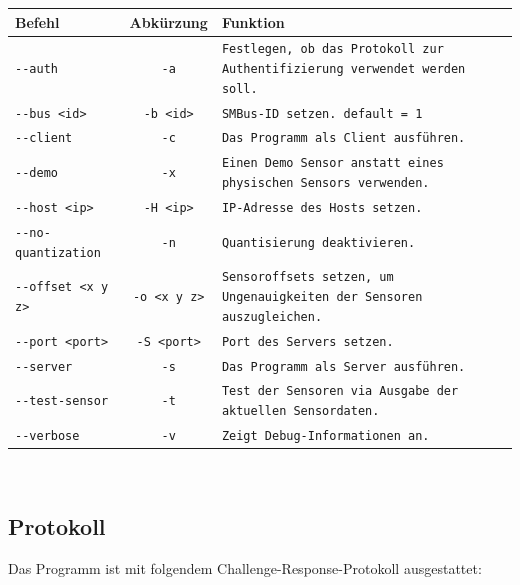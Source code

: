 \documentclass{article}
\begin{document}
\begin{tabular}{|l|c|p{8cm}|}
	\hline
	Befehl & Abkürzung & Funktion\\
	\hline
	\texttt{-{}-auth} & \texttt{-a} & \texttt{Festlegen, ob das Protokoll zur Authentifizierung verwendet werden soll.}\\
	\hline
	\texttt{-{}-bus <id>} & \texttt{-b <id>} & \texttt{SMBus-ID setzen. default = 1}\\
	\hline
	\texttt{-{}-client} & \texttt{-c} & \texttt{Das Programm als Client ausführen.}\\
	\hline
	\texttt{-{}-demo} & \texttt{-x} & \texttt{Einen Demo Sensor anstatt eines physischen Sensors verwenden.}\\
	\hline
	\texttt{-{}-host <ip>} & \texttt{-H <ip>} & \texttt{IP-Adresse des Hosts setzen.}\\
	\hline
	\texttt{-{}-no-quantization} & \texttt{-n} & \texttt{Quantisierung deaktivieren.}\\
	\hline
	\texttt{-{}-offset <x y z>} & \texttt{-o <x y z>} & \texttt{Sensoroffsets setzen, um Ungenauigkeiten der Sensoren auszugleichen.}\\
	\hline
	\texttt{-{}-port <port>} & \texttt{-S <port>} & \texttt{Port des Servers setzen.}\\
	\hline
	\texttt{-{}-server} & \texttt{-s} & \texttt{Das Programm als Server ausführen.}\\
	\hline
	\texttt{-{}-test-sensor} & \texttt{-t} & \texttt{Test der Sensoren via Ausgabe der aktuellen Sensordaten.}\\
	\hline
	\texttt{-{}-verbose} & \texttt{-v} & \texttt{Zeigt Debug-Informationen an.}\\
	\hline
\end{tabular}\\

\newpage

\subsection{Protokoll}
Das Programm ist mit folgendem Challenge-Response-Protokoll ausgestattet:\\
\end{document}
